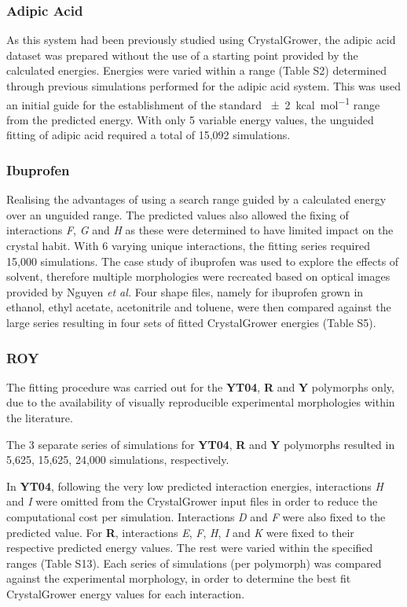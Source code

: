 \documentclass[twoside,twocolumn,9pt]{article}
\begin{document}
\subsubsection{Adipic Acid}

As this system had been previously studied using CrystalGrower, the adipic acid dataset was prepared without the use of a starting point provided by the calculated energies. Energies were varied within a range (Table S2) determined through previous simulations performed for the adipic acid system. This was used an initial guide for the establishment of the 
standard \qty{\pm 2}{kcal.mol^{-1}} range from the predicted energy. With only 5 variable energy values, the unguided fitting of adipic acid required a total of 15,092 simulations.

\subsubsection{Ibuprofen}

Realising the  advantages of using a search range guided by a calculated energy over an unguided range. The predicted values also allowed the fixing of interactions \textit{F},  \textit{G} and \textit{H}
as these were determined to have limited impact on the crystal habit. With 6 varying unique interactions, the fitting series required 15,000 simulations. 
The case study of ibuprofen was used to explore the effects of solvent, therefore multiple 
morphologies were recreated based on optical images provided by Nguyen \textit{et al.}\cite{Nguyen2014} 
Four shape files, namely for ibuprofen grown in ethanol, ethyl acetate, acetonitrile and toluene, were then compared against the large series resulting in four sets of fitted CrystalGrower energies (Table S5).

\subsubsection{ROY}

The fitting procedure was carried out for the \textbf{YT04}, \textbf{R} and \textbf{Y} polymorphs only, due to the availability of visually reproducible experimental morphologies within the literature. 

The 3 separate series of simulations for \textbf{YT04}, \textbf{R} and \textbf{Y} polymorphs resulted in 5,625, 15,625, 24,000 simulations, respectively. 

In \textbf{YT04}, following the very low predicted interaction energies, interactions \textit{H} and \textit{I} were omitted from the CrystalGrower input files in order to reduce the computational cost per simulation. Interactions \textit{D} and \textit{F} were also fixed to the predicted value.
For \textbf{R}, interactions \textit{E}, \textit{F}, \textit{H}, \textit{I} and \textit{K}
were fixed to their respective predicted energy values. The rest were varied within the specified ranges (Table S13). Each series of simulations (per polymorph) was compared against the experimental morphology, in order to determine the best fit CrystalGrower energy values for each interaction.
\end{document}
